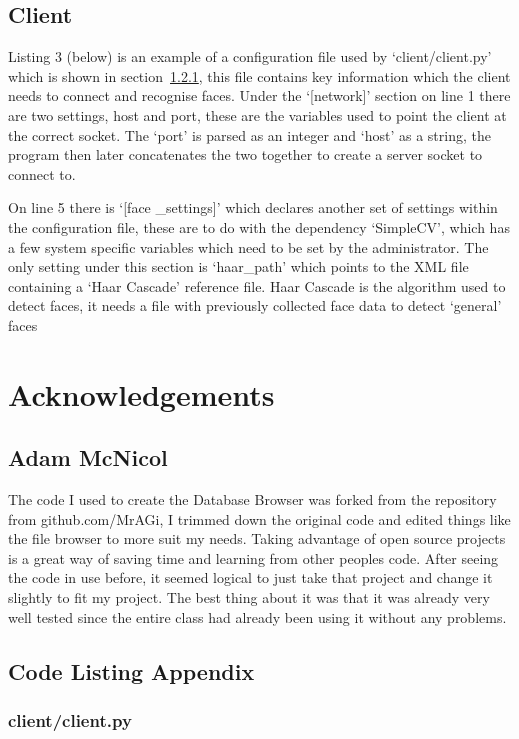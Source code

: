 \documentclass[12pt,a4paper]{report}
\begin{document}
    \subsection{Client}
    Listing 3 (below) is an example of a configuration file used by `client/client.py' which is shown in section~\ref{sec:client.py},
    this file contains key information which the client needs to connect and recognise faces. Under the `[network]' section
    on line 1 there are two settings, host and port, these are the variables used to point the client at the correct socket.
    The `port' is parsed as an integer and `host' as a string, the program then later concatenates the two together to create
    a server socket to connect to.

    On line 5 there is `[face \_settings]' which declares another set of settings within the configuration file, these are to do with
    the dependency `SimpleCV', which has a few system specific variables which need to be set by the administrator. The only setting
    under this section is `haar\_path' which points to the XML file containing a `Haar Cascade' reference file. Haar Cascade is the
    algorithm used to detect faces, it needs a file with previously collected face data to detect `general' faces
    
\section{Acknowledgements}
    \subsection{Adam McNicol}
    The code I used to create the Database Browser was forked from the repository from github.com/MrAGi, I trimmed
    down the original code and edited things like the file browser to more suit my needs. Taking advantage of
    open source projects is a great way of saving time and learning from other peoples code. After seeing the code
    in use before, it seemed logical to just take that project and change it slightly to fit my project. The best
    thing about it was that it was already very well tested since the entire class had already been using it without
    any problems.

    \subsection{Code Listing Appendix}
        \subsubsection{client/client.py}
        \label{sec:client.py}
        
\end{document}

